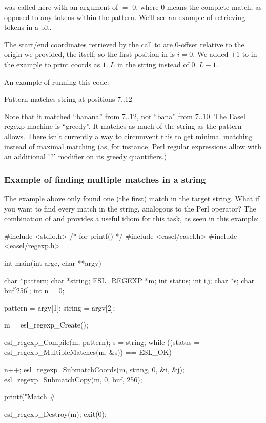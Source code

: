  was called here with an argument
of $=$ 0, where 0 means the complete match, as opposed to
any tokens within the pattern. We'll see an example of retrieving
tokens in a bit.

The  start/end coordinates retrieved by the call to
 are 0-offset relative to the
origin we provided, the  itself; so the first position
in  is $i=0$. We added $+1$ to  in the
example to print coords as $1..L$ in the string instead of $0..L-1$.

An example of running this code:

\begin{cchunk}
  Pattern matches string at positions 7..12
\end{cchunk}

Note that it matched ``banana'' from 7..12, not ``bana'' from
7..10. The Easel regexp machine is ``greedy''. It matches as much of
the string as the pattern allows. There isn't currently a way to
circumvent this to get minimal matching instead of maximal matching
(as, for instance, Perl regular expressions allow with an additional
'?' modifier on its greedy quantifiers.)

\subsubsection{Example of finding multiple matches in a string}

The example above only found one (the first) match in the target
string. What if you want to find every match in the string, analogous
to the Perl  operator? The combination of
 and
 provides a useful idiom for
this task, as seen in this example:

\begin{cchunk}
#include <stdio.h> /* for printf() */
#include <easel/easel.h>
#include <easel/regexp.h>

int
main(int argc, char **argv)
{
  char       *pattern;
  char       *string;
  ESL_REGEXP *m;
  int         status;
  int         i,j;
  char       *s;
  char        buf[256];
  int         n = 0;

  pattern = argv[1];
  string  = argv[2];

  m = esl_regexp_Create();

  esl_regexp_Compile(m, pattern);
  s = string;
  while ((status = esl_regexp_MultipleMatches(m, &s)) == ESL_OK)
    {
      n++;
      esl_regexp_SubmatchCoords(m, string, 0, &i, &j);
      esl_regexp_SubmatchCopy(m, 0, buf, 256);

      printf("Match #%
    }
  
  esl_regexp_Destroy(m);
  exit(0);
}
\end{cchunk}

